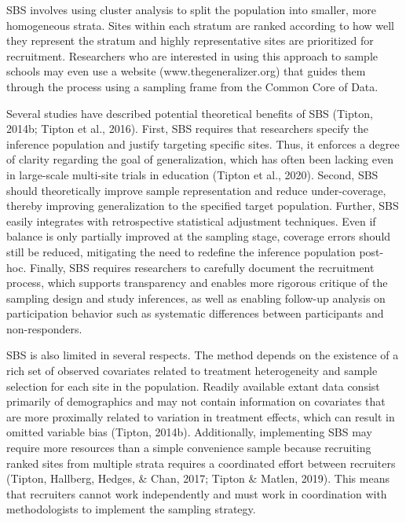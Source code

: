 \documentclass[
  man,floatsintext]{apa6}
\begin{document}
SBS involves using cluster analysis to split the population into smaller, more homogeneous strata. Sites within each stratum are ranked according to how well they represent the stratum and highly representative sites are prioritized for recruitment.
Researchers who are interested in using this approach to sample schools may even use a website (www.thegeneralizer.org) that guides them through the process using a sampling frame from the Common Core of Data.

Several studies have described potential theoretical benefits of SBS (Tipton, 2014b; Tipton et al., 2016). First, SBS requires that researchers specify the inference population and justify targeting specific sites. Thus, it enforces a degree of clarity regarding the goal of generalization, which has often been lacking even in large-scale multi-site trials in education (Tipton et al., 2020). Second, SBS should theoretically improve sample representation and reduce under-coverage, thereby improving generalization to the specified target population. Further, SBS easily integrates with retrospective statistical adjustment techniques. Even if balance is only partially improved at the sampling stage, coverage errors should still be reduced, mitigating the need to redefine the inference population post-hoc.
Finally, SBS requires researchers to carefully document the recruitment process, which supports transparency and enables more rigorous critique of the sampling design and study inferences, as well as enabling follow-up analysis on participation behavior such as systematic differences between participants and non-responders.

SBS is also limited in several respects. The method depends on the existence of a rich set of observed covariates related to treatment heterogeneity and sample selection for each site in the population. Readily available extant data consist primarily of demographics and may not contain information on covariates that are more proximally related to variation in treatment effects, which can result in omitted variable bias (Tipton, 2014b). Additionally, implementing SBS may require more resources than a simple convenience sample because recruiting ranked sites from multiple strata requires a coordinated effort between recruiters (Tipton, Hallberg, Hedges, \& Chan, 2017; Tipton \& Matlen, 2019). This means that recruiters cannot work independently and must work in coordination with methodologists to implement the sampling strategy.
\end{document}
